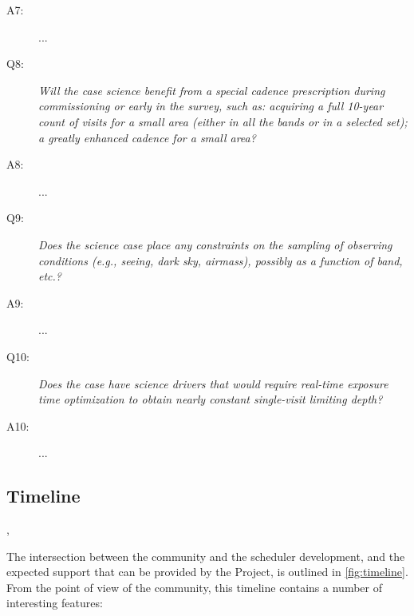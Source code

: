 \begin{description}
\item[A7:] ...

\item[Q8:] {\it Will the case science benefit from a special cadence
prescription during commissioning or early in the survey, such as:
acquiring a full 10-year count of visits for a small area (either in all
the bands or in a  selected set); a greatly enhanced cadence for a small
area?}

\item[A8:] ...

\item[Q9:] {\it Does the science case place any constraints on the
sampling of observing conditions (e.g., seeing, dark sky, airmass),
possibly as a function of band, etc.?}

\item[A9:] ...

\item[Q10:] {\it Does the case have science drivers that would require
real-time exposure time optimization to obtain nearly constant
single-visit limiting depth?}

\item[A10:] ...

\end{description}

\navigationbar



\subsection{Timeline}
\label{sec:\secname:timeline}

,

The intersection between the community and the scheduler development,
and the expected support that can be provided by the Project, is
outlined in \autoref{fig:timeline}. From the point of view of the community, this timeline contains a number of interesting features:


